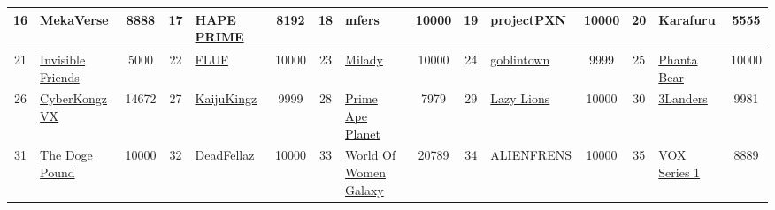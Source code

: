 \begin{table*}[]
{\begin{tabular}{|c|l|c|c|l|c|c|l|c|c|l|c|c|l|c|}
        16    & \href{https://themekaverse.com/}{MekaVerse}                                        & 8888              & 17    & \href{https://hape.io/}{HAPE PRIME}                                                               & 8192              & 18    & \href{https://opensea.io/collection/mfers}{mfers}                                 & 10000             & 19    & \href{http://phantom.sh}{projectPXN}                                          & 10000             & 20    & \href{http://karafuru.io}{Karafuru}                                                       & 5555                                    \\ \hline
        21    & \href{https://invisiblefriends.io}{Invisible Friends}                              & 5000              & 22    & \href{https://fluf.world/}{FLUF}                                                                  & 10000             & 23    & \href{https://miladymaker.net}{Milady}                                            & 10000             & 24    & \href{https://goblintown.wtf/}{goblintown}                                    & 9999              & 25    & \href{https://ezek.io/}{Phanta Bear}                                                      & 10000                                   \\ \hline
        26    & \href{http://cyberkongz.com}{CyberKongz VX}                                        & 14672             & 27    & \href{https://kaijukingz.io/\#/}{KaijuKingz}                                                      & 9999              & 28    & \href{https://primeplanet.io/}{Prime Ape Planet}                                  & 7979              & 29    & \href{http://lazylionsnft.com}{Lazy Lions}                                    & 10000             & 30    & \href{https://3landersnft.com/}{3Landers}                                                 & 9981                                    \\ \hline
        31    & \href{https://thedogepoundnft.com/}{The Doge Pound}                                & 10000             & 32    & \href{https://deadfellaz.io}{DeadFellaz}                                                          & 10000             & 33    & \href{https://worldofwomen.art/wow-galaxy}{World Of Women Galaxy}                 & 20789             & 34    & \href{http://alienfrens.io}{ALIENFRENS}                                       & 10000             & 35    & \href{http://collectvox.com}{VOX Series 1}                                                & 8889                                    \\ \hline

\end{tabular}}
\end{table*}
